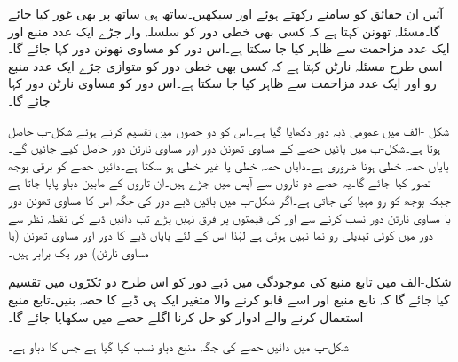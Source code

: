 آئیں ان حقائق کو سامنے رکھتے ہوئے  اور  سیکھیں۔ساتھ ہی ساتھ  پر بھی غور کیا جائے گا۔مسئلہ تھونن کہتا ہے کہ کسی بھی خطی دور کو سلسلہ وار جڑے ایک عدد منبع اور ایک عدد مزاحمت سے ظاہر کیا جا سکتا ہے۔اس دور کو مساوی تھونن دور کہا جائے گا۔اسی طرح مسئلہ نارٹن کہتا ہے کہ کسی بھی خطی دور کو متوازی جڑے ایک عدد منبع رو اور ایک عدد مزاحمت سے ظاہر  کیا جا سکتا ہے۔اس دور کو مساوی نارٹن دور کہا جائے گا۔

شکل -الف میں عمومی ڈبہ دور دکھایا گیا ہے۔اس کو دو حصوں میں تقسیم کرتے ہوئے شکل-ب حاصل ہوتا ہے۔شکل-ب میں بائیں حصے کے مساوی تھونن دور اور مساوی نارٹن دور حاصل کیے جائیں گے۔بایاں حصہ خطی ہونا ضروری ہے۔دایاں حصہ خطی یا غیر خطی ہو سکتا ہے۔دائیں حصے کو برقی بوجھ تصور کیا جائے گا۔یہ حصے دو تاروں سے آپس میں جڑے ہیں۔ان تاروں کے مابین  دباو پایا جاتا ہے جبکہ بوجھ کو رو  مہیا کی جاتی ہے۔اگر شکل-ب میں بائیں ڈبے دور کی جگہ اس کا مساوی تھونن دور یا مساوی نارٹن دور نسب کرنے سے  اور  کی قیمتوں پر فرق نہیں پڑے تب دائیں ڈبے کی نقطہ نظر سے دور میں کوئی تبدیلی رو نما نہیں ہوئی ہے لہٰذا اس کے لئے بایاں ڈبے کا دور اور مساوی تھونن (یا مساوی نارٹن) دور یک برابر ہیں۔

شکل-الف میں تابع منبع کی موجودگی میں ڈبے دور کو اس طرح دو ٹکڑوں میں تقسیم کیا جائے گا کہ تابع منبع اور اسے قابو کرنے والا متغیر ایک ہی ڈبے کا حصہ بنیں۔تابع منبع استعمال کرنے والے ادوار کو حل کرنا اگلے حصے میں سکھایا جائے گا۔

شکل-پ میں دائیں حصے کی جگہ  منبع دباو نسب کیا گیا ہے جس کا دباو  ہے۔ 

